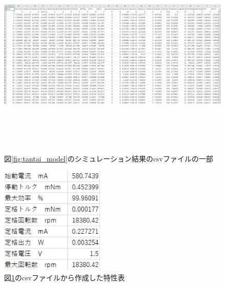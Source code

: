   \begin{figure}[t]
	\centering
	\includegraphics[width=16.5cm,height=10cm]{./Image/simyu_csv.png}
	\caption{図\ref{fig:tantai_model}のシミュレーション結果のcsvファイルの一部}
	\label{fig:simyu_csv}
  \end{figure}

  \begin{figure}[t]
	\centering
	\includegraphics[width=5cm]{./Image/chara_table.png}
	\caption{図\ref{fig:simyu_csv}のcsvファイルから作成した特性表}
	\label{fig:tokuseihyou}
  \end{figure}